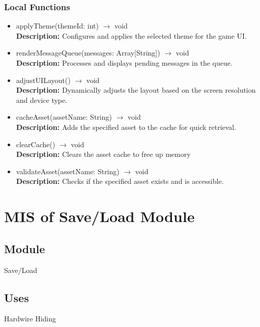 \documentclass[12pt, titlepage]{article}
\begin{document}
\subsubsection{Local Functions}
\begin{itemize}
\item applyTheme(themeId: int) $\rightarrow$ void\\
\textbf{Description:} Configures and applies the selected theme for the game UI.

\item renderMessageQueue(messages: Array[String]) $\rightarrow$ void\\
\textbf{Description:} Processes and displays pending messages in the queue.

\item adjustUILayout() $\rightarrow$ void\\
\textbf{Description:} Dynamically adjusts the layout based on the screen resolution and device type.

\item cacheAsset(assetName: String) $\rightarrow$ void\\
\textbf{Description:} Adds the specified asset to the cache for quick retrieval.

\item clearCache() $\rightarrow$ void\\
\textbf{Description:} Clears the asset cache to free up memory

\item validateAsset(assetName: String) $\rightarrow$ void\\
\textbf{Description:} Checks if the specified asset exists and is accessible.

\end{itemize}





\section{MIS of Save/Load Module} 

\subsection{Module}
\hspace{1.5em}Save/Load

\subsection{Uses}
\hspace{1.5em}Hardwire Hiding
\end{document}
